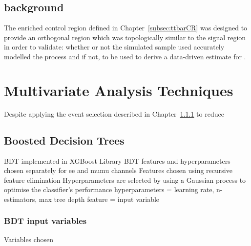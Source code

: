\subsection{\ttbar background}\label{subsec:ttbarEstimation}
The \ttbar enriched control region defined in Chapter~\ref{subsec:ttbarCR} was designed to provide an orthogonal region which was topologically similar to the signal region in order to validate:
 whether or not the simulated \ttbar sample used accurately modelled the \ttbar process
 and if not, to be used to derive a data-driven estimate for \ttbar.



\section{Multivariate Analysis Techniques}\label{sec:mvas}

Despite applying the event selection described in Chapter~\ref{} to reduce 

\subsection{Boosted Decision Trees}\label{subsec:bdt}

BDT implemented in XGBoost Library
BDT features and hyperparameters chosen separately for ee and mumu channels
Features chosen using recursive feature elimination
Hyperparameters are selected by using a Gaussian process to optimise the classifier’s performance
hyperparameters = learning rate, n-estimators, max tree depth
feature = input variable

\subsubsection{BDT input variables}
Variables chosen

